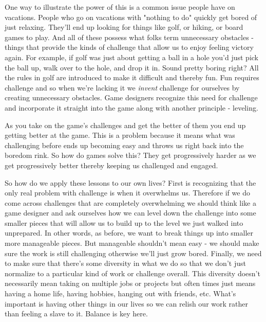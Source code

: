 \documentclass[11pt,a5paper]{book}
\begin{document}
One way to illustrate the power of this is a common issue people have on vacations. People who go on vacations with "nothing to do" quickly get bored of just relaxing. They'll end up looking for things like golf, or hiking, or board games to play. And all of these possess what folks term unnecessary obstacles \cite{superbetter} - things that provide the kinds of challenge that allow us to enjoy feeling victory again. For example, if golf was just about getting a ball in a hole you'd just pick the ball up, walk over to the hole, and drop it in. Sound pretty boring right? All the rules in golf are introduced to make it difficult and thereby fun. Fun requires challenge and so when we're lacking it we \textit{invent} challenge for ourselves by creating unnecessary obstacles. Game designers recognize this need for challenge and incorporate it straight into the game along with another principle - leveling.
\newline

As you take on the game's challenges and get the better of them you end up getting better at the game. This is a problem because it means what was challenging before ends up becoming easy and throws us right back into the boredom rink. So how do games solve this? They get progressively harder as we get progressively better thereby keeping us challenged and engaged.
\newline

So how do we apply these lessons to our own lives? First is recognizing that the only real problem with challenge is when it overwhelms us. Therefore if we do come across challenges that are completely overwhelming we should think like a game designer and ask ourselves how we can level down the challenge into some smaller pieces that will allow us to build up to the level we just walked into unprepared. In other words, as before, we want to break things up into smaller more manageable pieces. But manageable shouldn't mean easy - we should make sure the work is still challenging otherwise we'll just grow bored. Finally, we need to make sure that there's some diversity in what we do so that we don't just normalize to a particular kind of work or challenge overall. This diversity doesn't necessarily mean taking on multiple jobs or projects but often times just means having a home life, having hobbies, hanging out with friends, etc. What's important is having other things in our lives so we can relish our work rather than feeling a slave to it. Balance is key here. 
\newline
\end{document}
